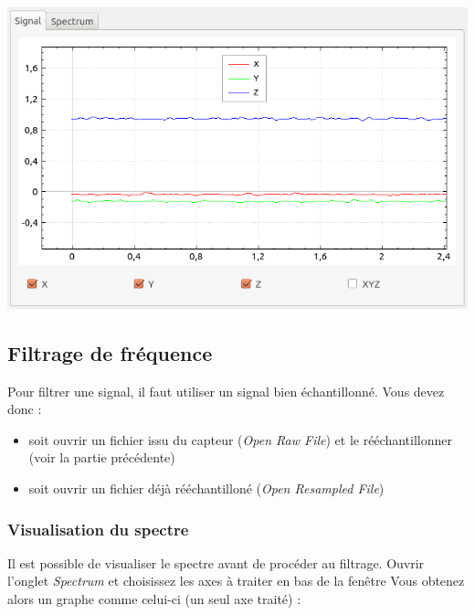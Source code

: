\documentclass[a4paper,12pt]{article}
\begin{document}
\begin{center}
 \includegraphics[width=17cm]{img/signal_graph.png}
\end{center}


\subsection{Filtrage de fréquence}
Pour filtrer une signal, il faut utiliser un signal bien échantillonné.
Vous devez donc :
\begin{itemize}
 \item soit ouvrir un fichier issu du capteur (\emph{Open Raw File}) et le rééchantillonner (voir la partie précédente)
 \item soit ouvrir un fichier déjà rééchantilloné (\emph{Open Resampled File})
\end{itemize}
\subsubsection{Visualisation du spectre}
Il est possible de visualiser le spectre avant de procéder au filtrage. 
Ouvrir l'onglet \emph{Spectrum} et choisissez les axes à traiter en bas de la fenêtre
Vous obtenez alors un graphe comme celui-ci (un seul axe traité) :
\end{document}
